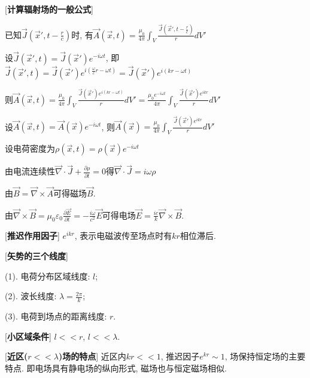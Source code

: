 [\textbf{计算辐射场的一般公式}]\par
\qquad 已知$\vec J(\vec x', t-\frac{r}{c})$时, 有$\vec A(\vec x,t)=\frac{\mu_0}{4\pi}\int_V\frac{\vec J(\vec x', t-\frac{r}{c})}{r}dV'$\par
\qquad 设$\vec J(\vec x',t)=\vec J(\vec x')e^{-i\omega t}$, 即$\vec J(\vec x',t)=\vec J(\vec x')e^{i(\frac{\omega}{c}r-\omega t)}=\vec J(\vec x')e^{i(kr-\omega t)}$\par
\qquad \quad 则$\vec A(\vec x,t)=\frac{\mu_0}{4\pi}\int_V\frac{\vec J(\vec x')e^{i(kr-\omega t)}}{r}dV'=\frac{\mu_0e^{-i\omega t}}{4\pi}\int_V\frac{\vec J(\vec x')e^{ikr}}{r}dV'$\par
\qquad 设$\vec A(\vec x,t)=\vec A(\vec x)e^{-i\omega t}$, 则$\vec A(\vec x)=\frac{\mu_0}{4\pi}\int_V\frac{\vec J(\vec x')e^{ikr}}{r}dV'$\par
\qquad 设电荷密度为$\rho(\vec x,t)=\rho(\vec x)e^{-i\omega t}$\par
\qquad 由电流连续性$\vec\nabla\cdot\vec J+\frac{\partial \rho}{\partial t}=0$得$\vec\nabla\cdot\vec J=i\omega\rho$\par
\qquad 由$\vec B=\vec\nabla\times\vec A$可得磁场$\vec B$.\par
\qquad 由$\vec\nabla\times\vec B=\mu_0\varepsilon_0\frac{\partial\vec E}{\partial t}=-\frac{i\omega}{c^2}\vec E$可得电场$\vec E=\frac{ic}{k}\vec\nabla\times\vec B$.\par

[\textbf{推迟作用因子}] $e^{ikr}$, 表示电磁波传至场点时有$kr$相位滞后.\par

[\textbf{矢势的三个线度}]\par
\qquad (1). 电荷分布区域线度: $l$;\par
\qquad (2). 波长线度: $\lambda=\frac{2\pi}{k}$;\par
\qquad (3). 电荷到场点的距离线度: $r$.\par

[\textbf{小区域条件}] $l << r$, $l<<\lambda$.\par

[\textbf{近区($r<<\lambda$)场的特点}] 近区内$kr<<1$, 推迟因子$e^{kr}\sim 1$, 场保持恒定场的主要特点. 即电场具有静电场的纵向形式, 磁场也与恒定磁场相似.\par

